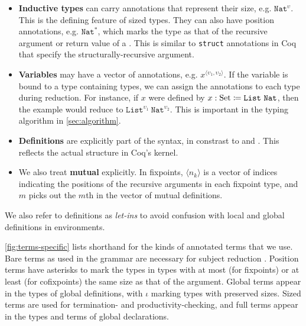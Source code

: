 \documentclass[nonacm,screen,10pt]{acmart}
\begin{document}
\begin{itemize}
    \item \textbf{Inductive types} can carry annotations that represent their size, e.g. $\texttt{Nat}^\upsilon$. This is the defining feature of sized types. They can also have position annotations, e.g. $\texttt{Nat}^*$, which marks the type as that of the recursive argument or return value of a \cofixpoint. This is similar to \texttt{struct} annotations in Coq that specify the structurally-recursive argument.
    \item \textbf{Variables} may have a vector of annotations, e.g. $x^{\langle \upsilon_1, \upsilon_2 \rangle}$. If the variable is bound to a type containing \coinductive types, we can assign the annotations to each \coinductive type during reduction. For instance, if $x$ were defined by $x : \text{Set} \coloneqq \texttt{List}\ \texttt{Nat}$, then the example would reduce to $\texttt{List}^{\upsilon_1}\ \texttt{Nat}^{\upsilon_2}$. This is important in the typing algorithm in \autoref{sec:algorithm}.
    \item \textbf{Definitions} are explicitly part of the syntax, in constrast to \CIChat and \CIChatbar \cite{cic-hat-bar}. This reflects the actual structure in Coq's kernel.
    \item We also treat \textbf{mutual \cofixpoints} explicitly. In fixpoints, $\langle n_k \rangle$ is a vector of indices indicating the positions of the recursive arguments in each fixpoint type, and $m$ picks out the $m$th \cofixpoint in the vector of mutual definitions.
\end{itemize}

We also refer to definitions \cite{ptsdef} as \textit{let-ins} to avoid confusion with local and global definitions in environments.

\begin{comment}
The simplicity of the size algebra of $S$, with only the successor operation $\widehat{\cdot}$, allows for easy and efficient size inference. We elaborate on this in \autoref{sec:algorithm}.
\end{comment}



\autoref{fig:terms-specific} lists shorthand for the kinds of annotated terms that we use. Bare terms as used in the grammar are necessary for subject reduction \cite{cic-hat-bar}. Position terms have asterisks to mark the types in \cofixpoint types with at most (for fixpoints) or at least (for cofixpoints) the same size as that of the \corecursive argument. Global terms appear in the types of global definitions, with $\iota$ marking types with preserved sizes. Sized terms are used for termination- and productivity-checking, and full terms appear in the types and terms of global declarations.
\end{document}
